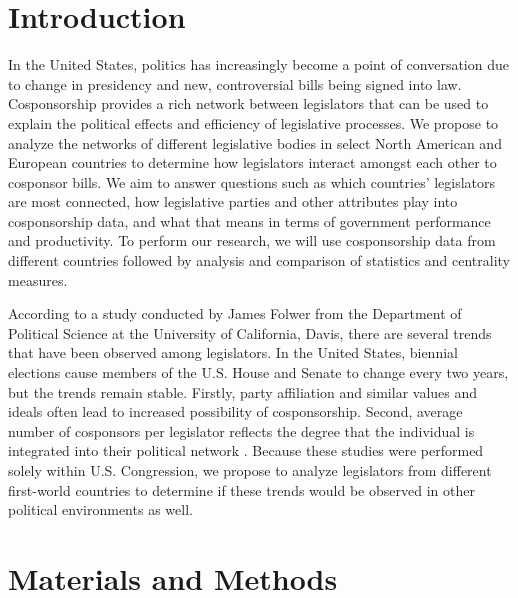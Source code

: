 \documentclass[12pt]{article}
\begin{document}
\begin{multicols*}{2}
\section{Introduction} 

In the United States, politics has increasingly become a point of conversation due to change in presidency and new, controversial bills being signed into law. Cosponsorship provides a rich network between legislators that can be used to explain the political effects and efficiency of legislative processes. We propose to analyze the networks of different legislative bodies in select North American and European countries to determine how legislators interact amongst each other to cosponsor bills. We aim to answer questions such as which countries' legislators are most connected, how legislative parties and other attributes play into cosponsorship data, and what that means in terms of government performance and productivity. To perform our research, we will use cosponsorship data from different countries followed by analysis and comparison of statistics and centrality measures.

According to a study conducted by James Folwer from the Department of Political Science at the University of California, Davis, there are several trends that have been observed among legislators. In the United States, biennial elections cause members of the U.S. House and Senate to change every two years, but the trends remain stable. Firstly, party affiliation and similar values and ideals often lead to increased possibility of cosponsorship. Second, average number of cosponsors per legislator reflects the degree that the individual is integrated into their political network \cite{fowler1}. Because these studies were performed solely within U.S. Congression, we propose to analyze legislators from different first-world countries to determine if these trends would be observed in other political environments as well.
 
\section{Materials and Methods}


\end{multicols*}
\end{document}
